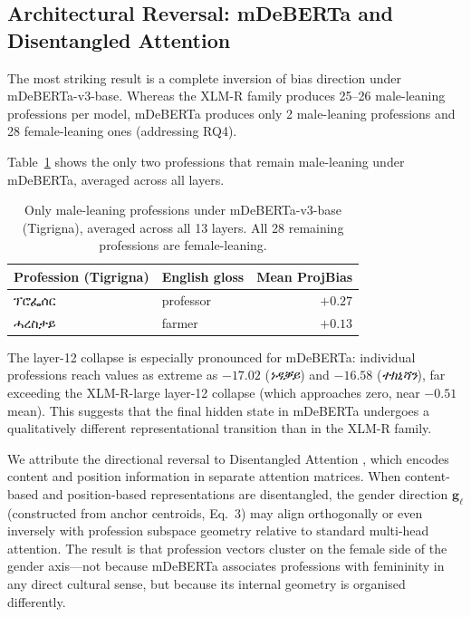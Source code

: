 \documentclass[10pt]{article}
\begin{document}
\subsection{Architectural Reversal: mDeBERTa and Disentangled Attention}
\label{sec:reversal}

The most striking result is a complete inversion of bias direction under
mDeBERTa-v3-base. Whereas the XLM-R family produces 25--26 male-leaning
professions per model, mDeBERTa produces only 2 male-leaning professions
and 28 female-leaning ones (addressing RQ4).

Table~\ref{tab:mdeberta-exceptions} shows the only two professions that
remain male-leaning under mDeBERTa, averaged across all layers.

\begin{table}[H]
\centering
\caption{Only male-leaning professions under mDeBERTa-v3-base (Tigrigna),
         averaged across all 13 layers. All 28 remaining professions are
         female-leaning.}
\label{tab:mdeberta-exceptions}
\small
\begin{tabular}{llr}
\toprule
\textbf{Profession (Tigrigna)} & \textbf{English gloss} & \textbf{Mean ProjBias} \\
\midrule
ፕሮፌሰር & professor & $+0.27$ \\
ሓረስታይ & farmer    & $+0.13$ \\
\bottomrule
\end{tabular}
\end{table}

The layer-12 collapse is especially pronounced for mDeBERTa: individual
professions reach values as extreme as $-17.02$ (\textit{ነዳቓይ}) and
$-16.58$ (\textit{ተክኒሻን}), far exceeding the XLM-R-large layer-12 collapse
(which approaches zero, near $-0.51$ mean). This suggests that the final
hidden state in mDeBERTa undergoes a qualitatively different representational
transition than in the XLM-R family.

We attribute the directional reversal to Disentangled Attention
\citep{he2021deberta}, which encodes content and position information in
separate attention matrices. When content-based and position-based
representations are disentangled, the gender direction $\mathbf{g}_\ell$
(constructed from anchor centroids, Eq.~3) may align orthogonally or even
inversely with profession subspace geometry relative to standard multi-head
attention. The result is that profession vectors cluster on the female side
of the gender axis---not because mDeBERTa associates professions with
femininity in any direct cultural sense, but because its internal geometry
is organised differently.
\end{document}
